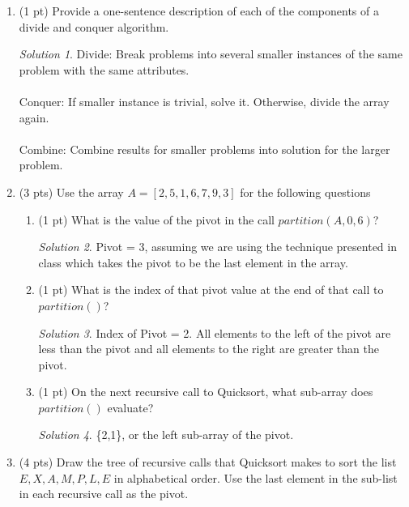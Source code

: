 \documentclass[12pt]{article}
\theoremstyle{remark}
\newtheorem*{solution}{Solution}
\begin{document}
\begin{enumerate}

    \item (1 pt) Provide a one-sentence description of each of the components of a divide and conquer algorithm.
    
    \begin{solution}
    Divide: Break problems into several smaller instances of the same problem with the same attributes. \\ \\
Conquer: If smaller instance is trivial, solve it. Otherwise, divide the array again. \\ \\
Combine: Combine results for smaller problems into solution for the larger problem.
    \end{solution}
    
    \item (3 pts) Use the array $A=[2,5,1,6,7,9,3]$ for the following questions
    \begin{enumerate}
        \item (1 pt) What is the value of the pivot in the call $partition(A,0,6)$?
        
        \begin{solution}
        Pivot = 3, assuming we are using the technique presented in class which takes the pivot to be the last element in the array.
        \end{solution}
        
        \item (1 pt) What is the index of that pivot value at the end of that call to $partition()$?
        
        \begin{solution}
        Index of Pivot = 2. All elements to the left of the pivot are less than the pivot and all elements to the right are greater than the pivot.
        \end{solution}
        
        \item (1 pt) On the next recursive call to Quicksort, what sub-array does $partition()$ evaluate?
        
        \begin{solution}
        \{2,1\}, or the left sub-array of the pivot.
        \end{solution}
        
    \end{enumerate}
	\item (4 pts) Draw the tree of recursive calls that Quicksort makes to sort the list \\${E,X,A,M,P,L,E}$ in alphabetical order. Use the last element in the sub-list in each recursive call as the pivot.
	

\end{enumerate}
\end{document}
